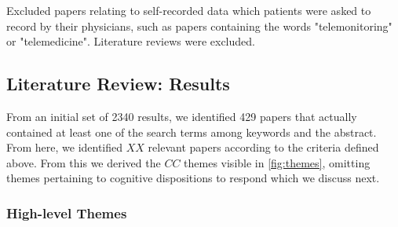 \documentclass{sigchi}
\begin{document}
Excluded papers relating to self-recorded data which patients were asked to record by their physicians, such as papers containing the words "telemonitoring" or "telemedicine". Literature reviews were excluded. 


\subsection{Literature Review: Results}

From an initial set of 2340 results, we identified 429 papers that actually contained at least one of the search terms among keywords and the abstract. From here, we identified $XX$ relevant papers according to the criteria defined above.  From this we derived the $CC$ themes visible in \ref{fig:themes}, omitting themes pertaining to cognitive dispositions to respond which we discuss next.

%
%

\def \w {$\bullet$}

\subsubsection{High-level Themes}

\end{document}
